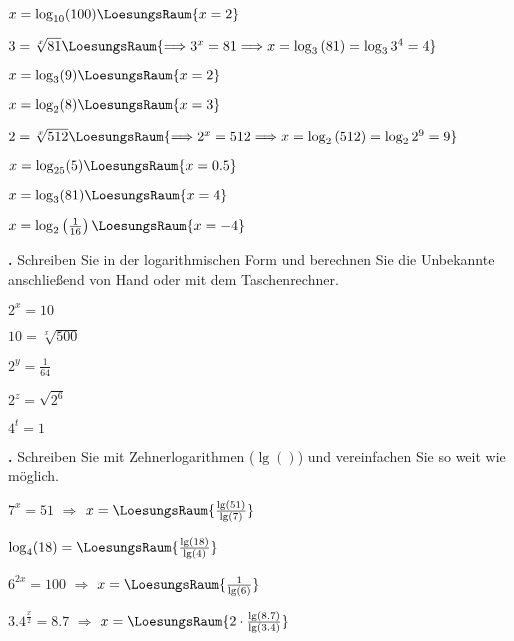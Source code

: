 \begin{bbwAufgabenBlock}
\item $x = \log_{10}(100)  \LoesungsRaum{x=2}$
\item $3 = \sqrt[x]{81}  \LoesungsRaum{\Longrightarrow 3^x=81 \Longrightarrow x=\log_3{}(81) = \log_3{3^4} = 4}$

\item $x = \log_3(9)  \LoesungsRaum{x=2}$
\item $x = \log_2(8)  \LoesungsRaum{x=3}$

\item $2 = \sqrt[x]{512}  \LoesungsRaum{\Longrightarrow 2^x=512 \Longrightarrow x=\log_2{}(512) = \log_2{2^9} = 9}$


\item $x = \log_{25}(5)  \LoesungsRaum{x=0.5}$
\noTRAINER{\newpage}
\item $x = \log_3(81)  \LoesungsRaum{x=4}$
\item $x = \log_2\left(\frac1{16}\right)  \LoesungsRaum{x=-4}$
\end{bbwAufgabenBlock}

\newpage

\textbf{\bbwAufgabenNummer{}.}
Schreiben Sie in der logarithmischen Form und berechnen Sie die
Unbekannte anschließend von Hand oder mit dem Taschenrechner.

\begin{bbwAufgabenBlock}
\item $2^x = 10$   
\item $10=\sqrt[x]{500}$ 

\item $2^y = \frac{1}{64}$   
\item $2^z = \sqrt{2^6}$   
\item $4^t= 1$   
\end{bbwAufgabenBlock}

\newpage

\textbf{\bbwAufgabenNummer{}.}
Schreiben Sie mit Zehnerlogarithmen ($\lg()$) und vereinfachen Sie so weit wie möglich.

\begin{bbwAufgabenBlock}
\item $7^x = 51$   $\Longrightarrow$ $x=\LoesungsRaum{ \frac{\lg(51)}{\lg(7)}}$
\item $\log_4(18) = \LoesungsRaum{\frac{\lg(18)}{\lg(4)}}$
\item $6^{2x} = 100$   $\Longrightarrow$ $x=\LoesungsRaum{ \frac1{\lg(6)}}$
\item $3.4^{\frac{x}{2}} = 8.7$   $\Longrightarrow$ $x=\LoesungsRaum{ 2\cdot{} \frac{\lg(8.7)}{\lg(3.4)} }$

\end{bbwAufgabenBlock}



